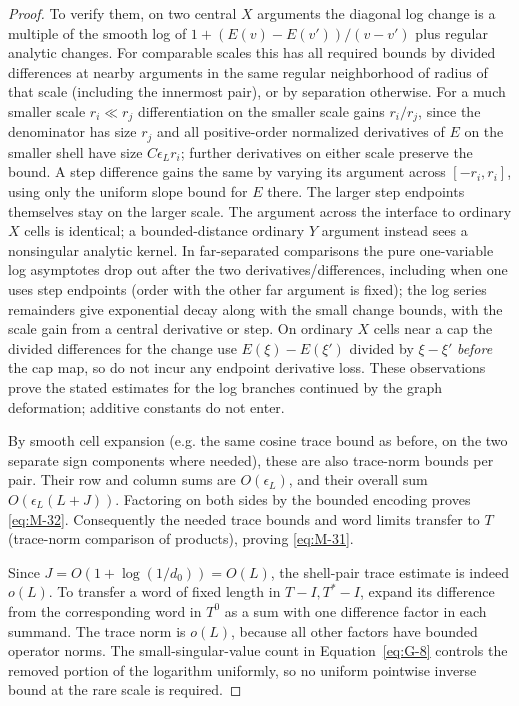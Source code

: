 \begin{proof}
To verify them, on two central \(X\) arguments the diagonal log change is a multiple of the smooth log of \(1+(E(v)-E(v'))/(v-v')\) plus regular analytic changes. For comparable scales this has all required bounds by divided differences at nearby arguments in the same regular neighborhood of radius of that scale (including the innermost pair), or by separation otherwise. For a much smaller scale \(r_i\ll r_j\) differentiation on the smaller scale gains \(r_i/r_j\), since the denominator has size \(r_j\) and all positive-order normalized derivatives of \(E\) on the smaller shell have size \(C\epsilon_L r_i\); further derivatives on either scale preserve the bound. A step difference gains the same by varying its argument across \([-r_i,r_i]\), using only the uniform slope bound for \(E\) there. The larger step endpoints themselves stay on the larger scale. The argument across the interface to ordinary \(X\) cells is identical; a bounded-distance ordinary \(Y\) argument instead sees a nonsingular analytic kernel. In far-separated comparisons the pure one-variable log asymptotes drop out after the two derivatives/differences, including when one uses step endpoints (order with the other far argument is fixed); the log series remainders give exponential decay along with the small change bounds, with the scale gain from a central derivative or step. On ordinary \(X\) cells near a cap the divided differences for the change use \(E(\xi)-E(\xi')\) divided by \(\xi-\xi'\) \emph{before} the cap map, so do not incur any endpoint derivative loss. These observations prove the stated estimates for the log branches continued by the graph deformation; additive constants do not enter.

By smooth cell expansion (e.g. the same cosine trace bound as before, on the two separate sign components where needed), these are also trace-norm bounds per pair. Their row and column sums are \(O(\epsilon_L)\), and their overall sum \(O(\epsilon_L(L+J))\). Factoring on both sides by the bounded encoding proves \eqref{eq:M-32}. Consequently the needed trace bounds and word limits transfer to \(T\) (trace-norm comparison of products), proving \eqref{eq:M-31}.


Since \(J=O(1+\log(1/d_0))=O(L)\), the shell-pair trace estimate is
indeed \(o(L)\). To transfer a word of fixed length in \(T-I,T^*-I\),
expand its difference from the corresponding word in \(T^0\) as a
sum with one difference factor in each summand. The trace norm is
\(o(L)\), because all other factors have bounded operator norms.
The small-singular-value count in Equation~\eqref{eq:G-8} controls the
removed portion of the logarithm uniformly, so no uniform pointwise
inverse bound at the rare scale is required.

\end{proof}

